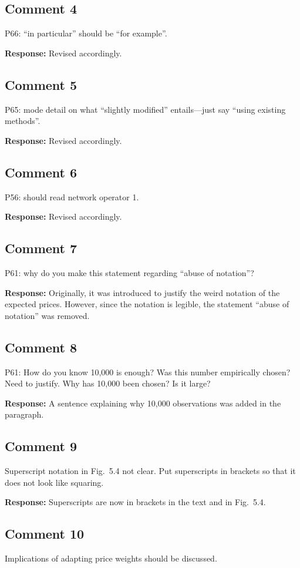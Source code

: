 \documentclass[10pt,a4paper,notitlepage]{article}
\numberwithin{equation}{section}
\begin{document}
\subsection{Comment 4}
P66: ``in particular'' should be ``for example''.

\textbf{Response:}
Revised accordingly.

\subsection{Comment 5}
P65: mode detail on what ``slightly modified'' entails---just say ``using existing methods''.

\textbf{Response:}
Revised accordingly.

\subsection{Comment 6}
P56: should read network operator 1.

\textbf{Response:}
Revised accordingly.

\subsection{Comment 7}
P61: why do you make this statement regarding ``abuse of notation''?

\textbf{Response:}
Originally, it was introduced to justify the weird notation of the expected prices. However, since the notation is legible, the statement ``abuse of notation'' was removed.

\subsection{Comment 8}
P61: How do you know 10,000 is enough? Was this number empirically chosen? Need to justify. Why has 10,000 been chosen? Is it large?

\textbf{Response:}
A sentence explaining why 10,000 observations was added in the paragraph.

\subsection{Comment 9}
Superscript notation in Fig.~5.4 not clear. Put superscripts in brackets so that it does not look like squaring.

\textbf{Response:}
Superscripts are now in brackets in the text and in Fig.~5.4.

\subsection{Comment 10}
Implications of adapting price weights should be discussed.
\end{document}
